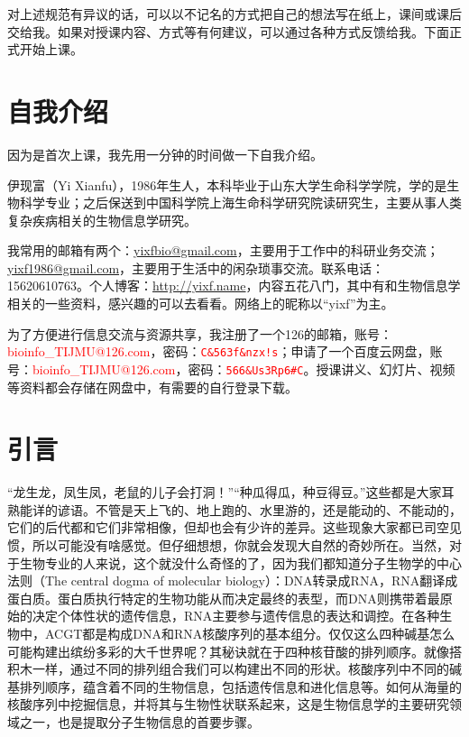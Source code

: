 对上述规范有异议的话，可以以不记名的方式把自己的想法写在纸上，课间或课后交给我。如果对授课内容、方式等有何建议，可以通过各种方式反馈给我。下面正式开始上课。

\section{自我介绍}
因为是首次上课，我先用一分钟的时间做一下自我介绍。

伊现富（Yi Xianfu），1986年生人，本科毕业于山东大学生命科学学院，学的是生物科学专业；之后保送到中国科学院上海生命科学研究院读研究生，主要从事人类复杂疾病相关的生物信息学研究。

我常用的邮箱有两个：\href{mailto:yixfbio@gmail.com}{yixfbio@gmail.com}，主要用于工作中的科研业务交流；\href{mailto:yixf1986@gmail.com}{yixf1986@gmail.com}，主要用于生活中的闲杂琐事交流。联系电话：15620610763。个人博客：\href{http://yixf.name}{http://yixf.name}，内容五花八门，其中有和生物信息学相关的一些资料，感兴趣的可以去看看。网络上的昵称以“yixf”为主。

为了方便进行信息交流与资源共享，我注册了一个126的邮箱，账号：\textcolor{red}{bioinfo\_TIJMU@126.com}，密码：\textcolor{red}{\texttt{C\&563f\&nzx!s}}；申请了一个百度云网盘，账号：\textcolor{red}{bioinfo\_TIJMU@126.com}，密码：\textcolor{red}{\texttt{566\&Us3Rp6\#C}}。授课讲义、幻灯片、视频等资料都会存储在网盘中，有需要的自行登录下载。

\section{引言}
“龙生龙，凤生凤，老鼠的儿子会打洞！”“种瓜得瓜，种豆得豆。”这些都是大家耳熟能详的谚语。不管是天上飞的、地上跑的、水里游的，还是能动的、不能动的，它们的后代都和它们非常相像，但却也会有少许的差异。这些现象大家都已司空见惯，所以可能没有啥感觉。但仔细想想，你就会发现大自然的奇妙所在。当然，对于生物专业的人来说，这个就没什么奇怪的了，因为我们都知道分子生物学的中心法则（The central dogma of molecular biology）：DNA转录成RNA，RNA翻译成蛋白质。蛋白质执行特定的生物功能从而决定最终的表型，而DNA则携带着最原始的决定个体性状的遗传信息，RNA主要参与遗传信息的表达和调控。在各种生物中，ACGT都是构成DNA和RNA核酸序列的基本组分。仅仅这么四种碱基怎么可能构建出缤纷多彩的大千世界呢？其秘诀就在于四种核苷酸的排列顺序。就像搭积木一样，通过不同的排列组合我们可以构建出不同的形状。核酸序列中不同的碱基排列顺序，蕴含着不同的生物信息，包括遗传信息和进化信息等。如何从海量的核酸序列中挖掘信息，并将其与生物性状联系起来，这是生物信息学的主要研究领域之一，也是提取分子生物信息的首要步骤。

